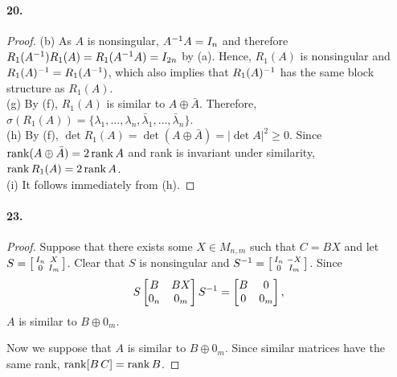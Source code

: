   \paragraph{20.}
  \begin{proof}
    (b) As $A$ is nonsingular, $A^{-1} A=I_n$ and therefore $R_1(A^{-1})R_1(A)=
    R_1(A^{-1} A)=I_{2n}$ by (a). Hence, $R_1(A)$ is nonsingular and $R_1(A)^{-1}=
    R_1(A^{-1})$, which also implies that $R_1(A)^{-1}$ has the same block 
    structure as $R_1(A)$. \\
    (g) By (f), $R_1(A)$ is similar to $A\oplus\bar{A}$. Therefore, $\sigma(R_1(
    A))=\{\lambda_1,\dots,\lambda_n,\bar{\lambda}_1,\dots,\bar{\lambda}_n\}$.\\
    (h) By (f), $\det R_1(A)=\det(A\oplus\bar{A})=|\det A|^2\ge 0$. Since $\operatorname{rank}
    (A\oplus\bar{A})=2\operatorname{rank} A$ and rank is invariant under similarity, $\operatorname{rank} 
    R_1(A)=2\operatorname{rank} A$.\\
    (i) It follows immediately from (h).
  \end{proof}

  \paragraph{23.}
  \begin{proof}
    Suppose that there exists some $X\in M_{n,m}$ such that $C=BX$ and let 
    $S=\begin{bsmallmatrix} I_n & X \\ 0 & I_m \end{bsmallmatrix}$. Clear that
    $S$ is nonsingular and $S^{-1}=\begin{bsmallmatrix} I_n & -X \\ 0 & I_m 
    \end{bsmallmatrix}$. Since
    \[
      S\begin{bmatrix}B & BX \\ 0_n & 0_m\end{bmatrix}S^{-1} = 
      \begin{bmatrix} B & 0 \\ 0 & 0_m\end{bmatrix},
    \]
    $A$ is similar to $B\oplus 0_m$.\par
    Now we suppose that $A$ is similar to $B\oplus 0_m$. Since similar matrices
    have the same rank, $\operatorname{rank}[B\,C] = \operatorname{rank} B$.    
  \end{proof}

